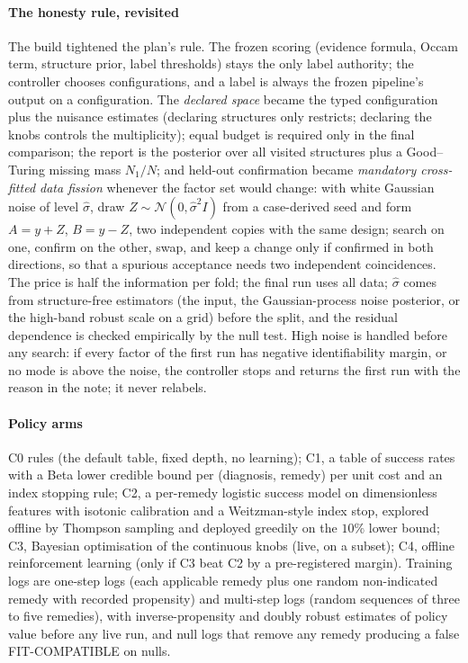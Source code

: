 \documentclass[11pt]{article}
\theoremstyle{plain}
\theoremstyle{definition}
\theoremstyle{remark}
\newcommand{\lab}[1]{\textsf{#1}}           %
\newcommand{\FC}{\lab{FIT-COMPATIBLE}}
\newcommand{\Normal}{\mathcal{N}}
\begin{document}
\paragraph{The honesty rule, revisited} The build tightened the plan's rule. The frozen scoring (evidence formula, Occam term, structure prior, label thresholds) stays the only label authority; the controller chooses configurations, and a label is always the frozen pipeline's output on a configuration.
The \emph{declared space} became the typed configuration plus the nuisance estimates (declaring structures only restricts; declaring the knobs controls the multiplicity); equal budget is required only in the final comparison; the report is the posterior over all visited structures plus a Good--Turing missing mass $N_1/N$;
and held-out confirmation became \emph{mandatory cross-fitted data fission} whenever the factor set would change: with white Gaussian noise of level $\hat\sigma$, draw $Z\sim\Normal(0,\hat\sigma^2I)$ from a case-derived seed and form $A=y+Z$, $B=y-Z$, two independent copies with the same design; search on one, confirm on the other, swap, and keep a change only if confirmed in both directions, so that a spurious acceptance needs two independent coincidences.
The price is half the information per fold; the final run uses all data; $\hat\sigma$ comes from structure-free estimators (the input, the Gaussian-process noise posterior, or the high-band robust scale on a grid) before the split, and the residual dependence is checked empirically by the null test. High noise is handled before any search: if every factor of the first run has negative identifiability margin, or no mode is above the noise, the controller stops and returns the first run with the reason in the note; it never relabels.

\paragraph{Policy arms} C0 rules (the default table, fixed depth, no learning); C1, a table of success rates with a Beta lower credible bound per (diagnosis, remedy) per unit cost and an index stopping rule; C2, a per-remedy logistic success model on dimensionless features with isotonic calibration and a Weitzman-style index stop, explored offline by Thompson sampling and deployed greedily on the $10\%$ lower bound;
C3, Bayesian optimisation of the continuous knobs (live, on a subset); C4, offline reinforcement learning (only if C3 beat C2 by a pre-registered margin). Training logs are one-step logs (each applicable remedy plus one random non-indicated remedy with recorded propensity) and multi-step logs (random sequences of three to five remedies), with inverse-propensity and doubly robust estimates of policy value before any live run, and null logs that remove any remedy producing a false \FC{} on nulls.
\end{document}
